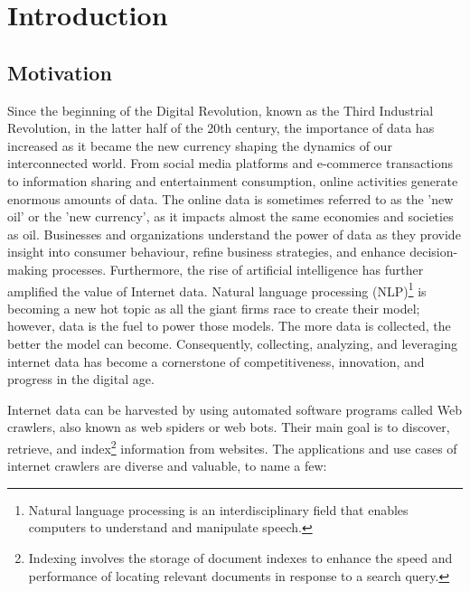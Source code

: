 \chapter{Introduction}
\label{chap:introduction}
\section{Motivation}


Since the beginning of the Digital Revolution, known as the Third Industrial Revolution, in the latter half of the 20th century, the importance of data has increased as it became the new currency shaping the dynamics of our interconnected world. From social media platforms and e-commerce transactions to information sharing and entertainment consumption, online activities generate enormous amounts of data. The online data is sometimes referred to as the 'new oil' or the 'new currency', as it impacts almost the same economies and societies as oil. Businesses and organizations understand the power of data as they provide insight into consumer behaviour, refine business strategies, and enhance decision-making processes. Furthermore, the rise of artificial intelligence has further amplified the value of Internet data. Natural language processing (NLP)\footnote{Natural language processing is an interdisciplinary field that enables computers to understand and manipulate speech.} is becoming a new hot topic as all the giant firms race to create their model; however, data is the fuel to power those models. The more data is collected, the better the model can become. Consequently, collecting, analyzing, and leveraging internet data has become a cornerstone of competitiveness, innovation, and progress in the digital age.

Internet data can be harvested by using automated software programs called Web crawlers, also known as web spiders or web bots. Their main goal is to discover, retrieve, and index\footnote{Indexing involves the storage of document indexes to enhance the speed and performance of locating relevant documents in response to a search query.} information from websites. The applications and use cases of internet crawlers are diverse and valuable, to name a few: 

